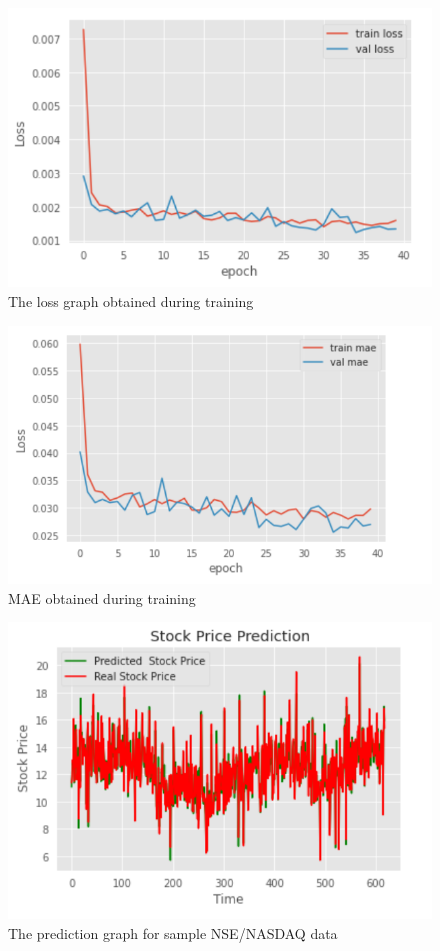 \documentclass[conference]{IEEEtran}
\begin{document}
\begin{figure}[htbp]
\centerline{\includegraphics[scale=0.7]{loss-1.png}}
\caption{The loss graph obtained during training}
\label{loss-1}
\end{figure}

\begin{figure}[htbp]
\centerline{\includegraphics[scale=0.7]{loss-2.png}}
\caption{MAE obtained during training}
\label{loss-2}
\end{figure}

\begin{figure}[htbp]
\centerline{\includegraphics[scale=0.7]{predict_1.png}}
\caption{The prediction graph for sample NSE/NASDAQ data}
\label{predict-1}
\end{figure}
\end{document}
